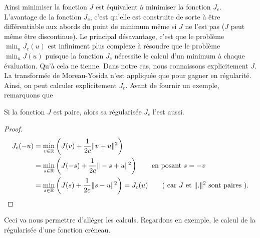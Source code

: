 \documentclass[main.tex]{subfiles}
\begin{document}
Ainsi minimiser la fonction $J$ est équivalent à minimiser la fonction $J_c$. 
L'avantage de la fonction $J_c$, c'est qu'elle est construite de sorte à être  différentiable aux abords du point de minimum même si $J$ ne l'est pas ($J$ peut même être discontinue). Le principal désavantage, c'est que le problème $\min_u J_c(u)$ est infiniment plus complexe à résoudre que le problème $\min_u J(u)$ puisque la fonction $J_c$ nécessite le calcul d'un minimum à chaque évaluation. Qu'à cela ne tienne. Dans notre cas, nous connaissons explicitement $J$. La transformée de Moreau-Yosida n'est appliquée que pour gagner en régularité. Ainsi, on peut calculer explicitement $J_c$. Avant de fournir un exemple, remarquons que 
\begin{prop}
Si la fonction $J$ est paire, alors sa régularisée $J_c$ l'est aussi.
\end{prop}
\begin{proof}
\begin{align*}
J_c(-u)  & = \min_{v\in \mathbb{R}} \left( J(v) + \frac{1}{2c} \| v+u \|^2 \right) \\
& =\min_{s\in \mathbb{R}} \left( J(-s) + \frac{1}{2c} \| -s+u \|^2 \right) \qquad \textrm{en posant } s=-v \\
& = \min_{s\in \mathbb{R}} \left( J(s) + \frac{1}{2c} \|s-u \|^2 \right) = J_c(u) \qquad \textrm{( car $J$ et $\|.\|^2$ sont paires )}.
\end{align*}
\end{proof}

Ceci va nous permettre d'alléger les calculs. Regardons en exemple, le calcul de la régularisée d'une fonction créneau.
\end{document}
